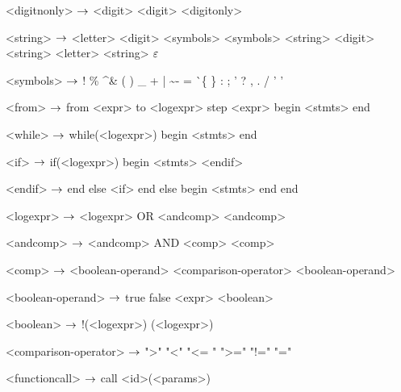 \begin{grammar}
<digitnonly> $\rightarrow$ <digit>
	\alt <digit> <digitonly>

<string> $\rightarrow$ <letter>
\alt <digit>
\alt <symbols>
\alt <symbols> <string>
\alt <digit> <string>
\alt <letter> <string>
\alt $\varepsilon$

<symbols> $\rightarrow$ !
\alt \%
\alt \^
\alt \&
\alt *
\alt (
\alt )
\alt \_
\alt +
\alt |
\alt \~
\alt -
\alt =
\alt \`
\alt \{
\alt \}
\alt [
\alt ]
\alt :
\alt ;
\alt '
\alt ?
\alt ,
\alt .
\alt /
\alt ' '

<from> $\rightarrow$ from <expr> to <logexpr> step <expr>
	begin
		<stmts>
	end 

<while> $\rightarrow$ while(<logexpr>)
		begin
			<stmts>
		end

<if> $\rightarrow$ if(<logexpr>)
	begin
		<stmts>
	<endif>

<endif> $\rightarrow$ end
	else <if>
	\alt end
	else
	begin
		<stmts>
	end
	\alt end

<logexpr> $\rightarrow$ <logexpr> OR <andcomp>
		\alt <andcomp>

<andcomp> $\rightarrow$ <andcomp> AND <comp>

<comp> $\rightarrow$ <boolean-operand> <comparison-operator> <boolean-operand>

<boolean-operand> $\rightarrow$ true
		\alt false
		\alt <boolean>

<boolean> $\rightarrow$ !(<logexpr>)
		\alt (<logexpr>)

<comparison-operator> $\rightarrow$ ">"
				\alt "<"
				\alt "<= "
				\alt ">="
				\alt "!="
				\alt "="

<functioncall> $\rightarrow$ call <id>(<params>)

\end{grammar}
